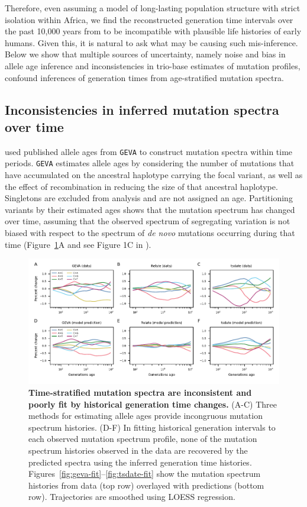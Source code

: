 \documentclass[]{article}
\newcommand{\GEVA}{\texttt{GEVA}\xspace}
\begin{document}
Therefore, even assuming a model of long-lasting population structure with
strict isolation within Africa, we find the reconstructed generation time
intervals over the past 10,000 years from \citet{wang2023human} to be
incompatible with plausible life histories of early humans. Given this, it is
natural to ask what may be causing such mis-inference. Below we show that
multiple sources of uncertainty, namely noise and bias in allele age inference
and inconsistencies in trio-base estimates of mutation profiles, confound
inferences of generation times from age-stratified mutation spectra.

\subsection*{Inconsistencies in inferred mutation spectra over time}

\citet{wang2023human} used
published allele ages from \GEVA \citep{albers2020dating}
to construct mutation spectra within time periods. \GEVA estimates
allele ages by considering the number of mutations that have accumulated on the
ancestral haplotype carrying the focal variant, as well as the effect of
recombination in reducing the size of that ancestral haplotype. Singletons are
excluded from analysis and are not assigned an age. Partitioning variants by
their estimated ages shows that the mutation spectrum has changed over time,
assuming that the observed spectrum of segregating variation is not biased with
respect to the spectrum of \emph{de novo} mutations occurring during that time
(Figure~\ref{fig:spectrum-ages}A and see Figure 1C in \citet{wang2023human}).

\begin{figure}[t!]
    \centering
    \includegraphics{../plots/fig1.pdf}
    \caption{
        \textbf{Time-stratified mutation spectra are inconsistent and poorly
        fit by historical generation time changes.} (A-C) Three methods for
        estimating allele ages provide incongruous mutation spectrum histories.
        (D-F) In fitting historical generation intervals to each observed
        mutation spectrum profile, none of the mutation spectrum histories
        observed in the data are recovered by the predicted spectra using the
        inferred generation time histories.
        Figures~\ref{fig:geva-fit}--\ref{fig:tsdate-fit} show the mutation
        spectrum histories from data (top row) overlayed with predictions
        (bottom row). Trajectories are smoothed using LOESS regression.
    }
    \label{fig:spectrum-ages}
\end{figure}
\end{document}
